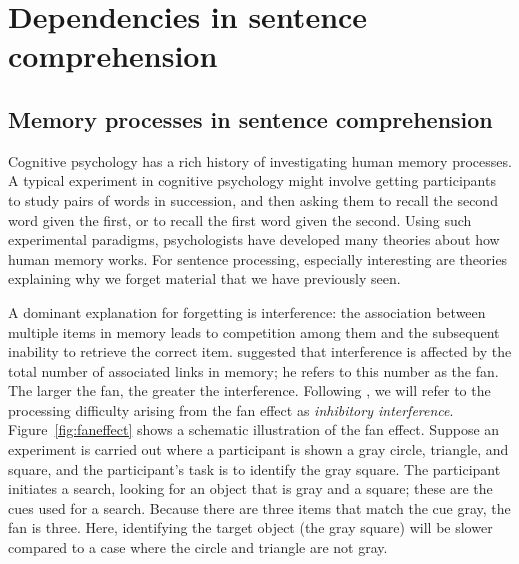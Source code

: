 \documentclass{cambridge7A}\usepackage[]{graphicx}\usepackage[]{color}
\begin{document}


\chapter{Dependencies in sentence comprehension} \label{c01}

\section{Memory processes in sentence comprehension}

 
 Cognitive psychology has a rich history of investigating human memory processes. A typical experiment in cognitive psychology might involve getting participants to study pairs of words in succession, and then asking them to recall the second word given the first, or to recall the first word given the second.  Using such experimental paradigms, psychologists have  developed many   theories about how human memory works. For sentence processing, especially interesting are theories explaining why we forget material that we have previously seen.  
 
 A dominant explanation for forgetting is interference:  the association between multiple items in memory leads to competition among them and the subsequent inability to retrieve the correct item. \cite{anderson1974retrieval} suggested that interference is affected by the total number of associated links in memory; he refers to this number as the fan. The larger the fan, the greater the interference. Following \cite{Dillon2011}, we will refer to the processing difficulty arising from the  fan effect as  \textit{inhibitory interference}.
Figure~\ref{fig:faneffect}  shows a schematic illustration of the fan effect. Suppose an experiment is carried out where a participant is shown a gray circle, triangle, and square, and the participant's task is to identify the gray square. The participant initiates a search, looking for an object that is gray and a square; these are the cues used for a search. Because there are three items that match the cue gray, the fan is three. Here, identifying the target object (the gray square) will be slower compared to a case where the circle and triangle are not gray. 
\end{document}
